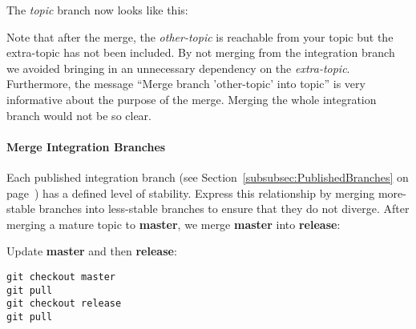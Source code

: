 The \textit{topic} branch now looks like this:

\begin{figure}
\centering
{}
\label{fig:BranchShape}
\end{figure}

Note that after the merge, the \textit{other-topic} is reachable from your topic
but the extra-topic has not been included. By not merging from the integration
branch we avoided bringing in an unnecessary dependency on the
\textit{extra-topic}. Furthermore, the message ``Merge branch 'other-topic' into
topic'' is very informative about the purpose of the merge. Merging the whole
integration branch would not be so clear.


\paragraph{Merge Integration Branches}
\label{par:MergeIntegrationBranches}

Each published integration branch (see Section~\ref{subsubsec:PublishedBranches}
on page~\pageref{subsubsec:PublishedBranches}) has a defined level of
stability. Express this relationship by merging more-stable branches into
less-stable branches to ensure that they do not diverge. After merging a mature
topic to \textbf{master}, we merge \textbf{master} into \textbf{release}:

Update \textbf{master} and then \textbf{release}:

\begin{verbatim}
git checkout master
git pull
git checkout release
git pull
\end{verbatim}

\begin{figure}
\centering
{}
\label{fig:UpdateBranches}
\end{figure}

